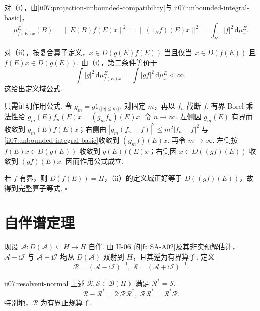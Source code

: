 \begin{FAProof}
对（i），由\autoref{ii07:projection-unbounded-compatibility}与\autoref{ii07:unbounded-integral-basic}，
\[
\mu_{f(E)x}^E(B)=\|E(B)f(E)x\|^2=\|(1_Bf)(E)x\|^2=\int_B|f|^2\,\mathrm{d}\mu_x^E.
\]

对（ii），按复合算子定义，\(\displaystyle x\in D(g(E)f(E))\) 当且仅当 \(\displaystyle x\in D(f(E))\) 且 \(\displaystyle f(E)x\in D(g(E))\). 由（i），第二条件等价于
\[
\int|g|^2\,\mathrm{d}\mu_{f(E)x}^E
=
\int|gf|^2\,\mathrm{d}\mu_x^E<\infty,
\]
这给出定义域公式.

只需证明作用公式. 令 \(\displaystyle g_m=g1_{\{|g|\leqslant m\}}\). 对固定 \(\displaystyle m\)，再以 \(\displaystyle f_n\) 截断 \(\displaystyle f\). 有界 Borel 乘法性给
\(\displaystyle g_m(E)f_n(E)x=(g_mf_n)(E)x.\)
令 \(\displaystyle n\to\infty\). 左侧因 \(\displaystyle g_m(E)\) 有界而收敛到 \(\displaystyle g_m(E)f(E)x\)；右侧由 \(\displaystyle|g_m(f_n-f)|^2\leqslant m^2|f_n-f|^2\) 与\autoref{ii07:unbounded-integral-basic}收敛到 \(\displaystyle(g_mf)(E)x\). 再令 \(\displaystyle m\to\infty\). 左侧按 \(\displaystyle f(E)x\in D(g(E))\) 收敛到 \(\displaystyle g(E)f(E)x\)；右侧因 \(\displaystyle x\in D((gf)(E))\) 收敛到 \(\displaystyle(gf)(E)x\). 因而作用公式成立.

若 \(\displaystyle f\) 有界，则 \(\displaystyle D(f(E))=H\)，（ii）的定义域正好等于 \(\displaystyle D((gf)(E))\)，故得到完整算子等式.
\hfill\(\square\)
\end{FAProof}

\section{自伴谱定理}\label{sec:ii07-selfadjoint-spectral-theorem}

现设
\(\displaystyle \mathcal A:D(\mathcal A)\subseteq H\to H\)
自伴. 由 II-06 的\autoref{fa:SA-A02}及其非实预解估计，\(\displaystyle\mathcal A-\mathrm{i}\mathcal I\) 与 \(\displaystyle\mathcal A+\mathrm{i}\mathcal I\) 均从 \(\displaystyle D(\mathcal A)\) 双射到 \(\displaystyle H\)，且其逆为有界算子. 定义
\[
\mathcal R=(\mathcal A-\mathrm{i}\mathcal I)^{-1},
\;
\mathcal S=(\mathcal A+\mathrm{i}\mathcal I)^{-1}.
\]

\begin{FAProposition}[B][自伴预解的伴随与正规性]{ii07:resolvent-normal}
上述 \(\displaystyle\mathcal R,\mathcal S\in\mathcal B(H)\) 满足
\(\displaystyle \mathcal R^*=\mathcal S,\)
\[
\mathcal R-\mathcal R^*
=
2\mathrm{i}\mathcal R\mathcal R^*,
\;
\mathcal R\mathcal R^*=\mathcal R^*\mathcal R.
\]
特别地，\(\displaystyle\mathcal R\) 为有界正规算子.
\end{FAProposition}


